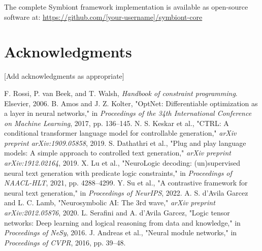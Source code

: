 \documentclass[conference]{IEEEtran}
\begin{document}
The complete Symbiont framework implementation is available as open-source software at: \url{https://github.com/[your-username]/symbiont-core}

\section*{Acknowledgments}

[Add acknowledgments as appropriate]

\begin{thebibliography}{00}
 F. Rossi, P. van Beek, and T. Walsh, \textit{Handbook of constraint programming}. Elsevier, 2006.
 B. Amos and J. Z. Kolter, "OptNet: Differentiable optimization as a layer in neural networks," in \textit{Proceedings of the 34th International Conference on Machine Learning}, 2017, pp. 136--145.
 N. S. Keskar et al., "CTRL: A conditional transformer language model for controllable generation," \textit{arXiv preprint arXiv:1909.05858}, 2019.
 S. Dathathri et al., "Plug and play language models: A simple approach to controlled text generation," \textit{arXiv preprint arXiv:1912.02164}, 2019.
 X. Lu et al., "NeuroLogic decoding: (un)supervised neural text generation with predicate logic constraints," in \textit{Proceedings of NAACL-HLT}, 2021, pp. 4288--4299.
 Y. Su et al., "A contrastive framework for neural text generation," in \textit{Proceedings of NeurIPS}, 2022.
 A. S. d'Avila Garcez and L. C. Lamb, "Neurosymbolic AI: The 3rd wave," \textit{arXiv preprint arXiv:2012.05876}, 2020.
 L. Serafini and A. d'Avila Garcez, "Logic tensor networks: Deep learning and logical reasoning from data and knowledge," in \textit{Proceedings of NeSy}, 2016.
 J. Andreas et al., "Neural module networks," in \textit{Proceedings of CVPR}, 2016, pp. 39--48.
\end{thebibliography}
\end{document}
